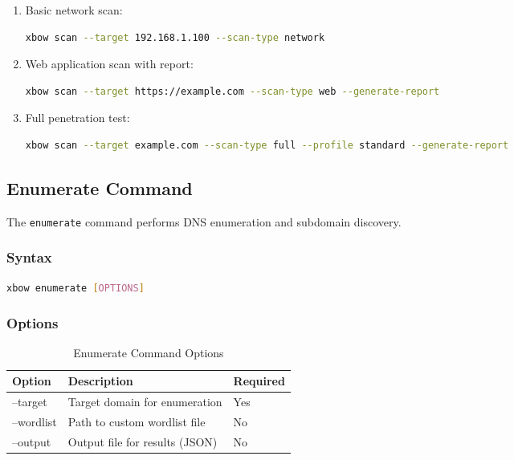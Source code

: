 \documentclass[12pt,a4paper]{report}
\begin{document}
\begin{enumerate}
    \item Basic network scan:
    \begin{lstlisting}[language=bash]
    xbow scan --target 192.168.1.100 --scan-type network
    \end{lstlisting}
    
    \item Web application scan with report:
    \begin{lstlisting}[language=bash]
    xbow scan --target https://example.com --scan-type web --generate-report
    \end{lstlisting}
    
    \item Full penetration test:
    \begin{lstlisting}[language=bash]
    xbow scan --target example.com --scan-type full --profile standard --generate-report
    \end{lstlisting}
\end{enumerate}

\subsection{Enumerate Command}

The \texttt{enumerate} command performs DNS enumeration and subdomain discovery.

\subsubsection{Syntax}

\begin{lstlisting}[language=bash]
xbow enumerate [OPTIONS]
\end{lstlisting}

\subsubsection{Options}

\begin{table}[H]
    \centering
    \caption{Enumerate Command Options}
    \label{tab:enumerate_options}
    \begin{tabular}{@{}p{3cm}p{8cm}p{2cm}@{}}
        \toprule
        Option & Description & Required \\
        \midrule
        --target & Target domain for enumeration & Yes \\
        --wordlist & Path to custom wordlist file & No \\
        --output & Output file for results (JSON) & No \\
        \bottomrule
    \end{tabular}
\end{table}
\end{document}
